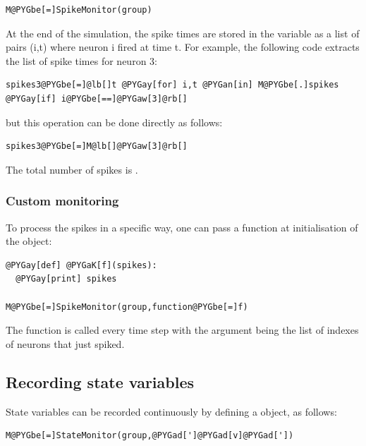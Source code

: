 \documentclass[letterpaper,10pt]{manual}
\begin{document}
\begin{Verbatim}[commandchars=@\[\]]
M@PYGbe[=]SpikeMonitor(group)
\end{Verbatim}

At the end of the simulation, the spike times are stored in the variable  as
a list of pairs (i,t) where neuron i fired at time t. For example, the following code extracts
the list of spike times for neuron 3:

\begin{Verbatim}[commandchars=@\[\]]
spikes3@PYGbe[=]@lb[]t @PYGay[for] i,t @PYGan[in] M@PYGbe[.]spikes @PYGay[if] i@PYGbe[==]@PYGaw[3]@rb[]
\end{Verbatim}

but this operation can be done directly as follows:

\begin{Verbatim}[commandchars=@\[\]]
spikes3@PYGbe[=]M@lb[]@PYGaw[3]@rb[]
\end{Verbatim}

The total number of spikes is .


\subsubsection{Custom monitoring}

To process the spikes in a specific way, one can pass a function at initialisation of the
\hyperlink{brian.SpikeMonitor}{} object:

\begin{Verbatim}[commandchars=@\[\]]
@PYGay[def] @PYGaK[f](spikes):
  @PYGay[print] spikes

M@PYGbe[=]SpikeMonitor(group,function@PYGbe[=]f)
\end{Verbatim}

The function  is called every time step with the argument  being the list of
indexes of neurons that just spiked.


\subsection{Recording state variables}

State variables can be recorded continuously by defining a \hyperlink{brian.StateMonitor}{} object, as follows:

\begin{Verbatim}[commandchars=@\[\]]
M@PYGbe[=]StateMonitor(group,@PYGad[']@PYGad[v]@PYGad['])
\end{Verbatim}
\end{document}

